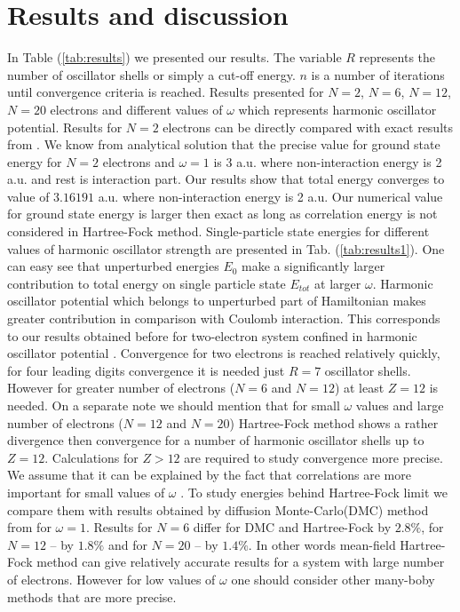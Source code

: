 \documentclass[10pt]{article}
\begin{document}
\section{Results and discussion}\label{results}

In Table (\ref{tab:results}) we presented our results. The variable $R$ represents the number of oscillator shells or simply a cut-off energy. $n$ is a number of iterations until convergence criteria is reached. Results presented for $N=2$, $N=6$, $N=12$, $N=20$ electrons and different values of $\omega$ which represents harmonic oscillator potential.
Results for $N=2$ electrons can be directly compared with exact results from \cite{Taut}. We know from analytical solution that the precise value for ground state energy for $N=2$ electrons and $\omega=1$ is 3 a.u. where non-interaction energy is 2 a.u. and rest is interaction part. Our results show that total energy converges to value of $3.16191$ a.u. where non-interaction energy is 2 a.u. Our numerical value for ground state energy is larger then exact as long as correlation energy is not considered in Hartree-Fock method.
Single-particle state energies for different values of harmonic oscillator strength are presented in Tab. (\ref{tab:results1}). One can easy see that unperturbed energies $E_0$ make a significantly larger contribution to total energy on single particle state $E_{tot}$ at larger $\omega$. Harmonic oscillator potential which belongs to unperturbed part of Hamiltonian makes greater contribution in comparison with  Coulomb interaction. This corresponds to our results obtained before for two-electron system confined in harmonic oscillator potential \cite{proj2}.
Convergence for two electrons is reached relatively quickly, for four leading digits convergence it is needed just $R=7$ oscillator shells. However for greater number of electrons  ($N=6$ and $N=12$) at least $Z=12$ is needed. On a separate note we should mention that for small $\omega$ values and large number of electrons ($N=12$ and $N=20$) Hartree-Fock method shows a rather divergence then convergence for a number of harmonic oscillator shells up to $Z=12$. Calculations for $Z > 12$ are required to study convergence more precise. We assume that it can be explained by the fact that correlations are more important for small values of $\omega$ \cite{Hjorth-Jensen}.
To study energies behind Hartree-Fock limit we compare them with results obtained by diffusion Monte-Carlo(DMC) method from \cite{Hjorth-Jensen} for $\omega=1$.
Results for $N=6$ differ for DMC and Hartree-Fock by $2.8\%$, for $N=12$ -- by $1.8\%$ and for $N=20$ -- by $1.4\%$. In other words mean-field Hartree-Fock method can give relatively accurate results for a system with large number of electrons. However for low values of $\omega$ one should consider other many-boby methods that are more precise.  
\end{document}
